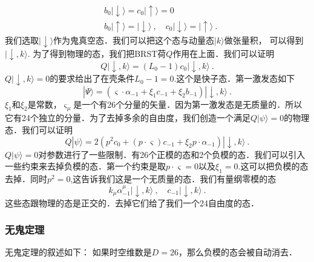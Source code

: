 \begin{equation}
\begin{aligned}
& b_0|\downarrow\rangle = c_0 |\uparrow\rangle = 0 \\
& b_0|\uparrow\rangle = |\downarrow\rangle~,\quad c_0|\downarrow\rangle = |\uparrow\rangle~.
\end{aligned} 
\end{equation}
我们选取$|\downarrow\rangle$作为鬼真空态．我们可以把这个态与动量态$|k\rangle$做张量积， 可以得到$|\downarrow,k\rangle$. 为了得到物理的态，我们把BRST荷$Q$作用在上面．我们可以证明
\begin{equation}
Q|\downarrow,k\rangle = (L_0-1)c_0|\downarrow,k\rangle~.
\end{equation}
$Q|\downarrow,k\rangle=0$的要求给出了在壳条件$L_0-1=0$.这个是快子态．第一激发态如下
\begin{equation}
|\Psi\rangle = (\varsigma\cdot\alpha_{-1}+\xi_1c_{-1}+\xi_2b_{-1})|\downarrow,k\rangle~.
\end{equation}
$\xi_1$和$\xi_2$是常数，$\varsigma_\mu$是一个有26个分量的矢量．因为第一激发态是无质量的．所以它有24个独立的分量．为了去掉多余的自由度，我们创造一个满足$Q|\psi\rangle = 0$的物理态．我们可以证明
\begin{equation}
Q|\psi\rangle = 2 (p^2 c_0+(p\cdot \varsigma) c_{-1} + \xi_2 p\cdot \alpha_{-1} ) | \downarrow, k\rangle~.
\end{equation}
$Q|\psi\rangle = 0$对参数进行了一些限制．有26个正模的态和2个负模的态．我们可以引入一些约束来去掉负模的态．第一个约束是取$p\cdot\varsigma = 0$以及$\xi_1=0$.这可以把负模的态去掉．同时$p^2=0$,这告诉我们这是一个无质量的态．我们有量纲零模的态
\begin{equation}
k_\mu\alpha^\mu_{-1}|\downarrow,k\rangle~,\quad c_{-1} |\downarrow,k\rangle~.
\end{equation}
这些态跟物理的态是正交的．去掉它们给了我们一个24自由度的态．

\subsubsection{无鬼定理}
无鬼定理的叙述如下：
如果时空维数是$D=26$，那么负模的态会被自动消去．

